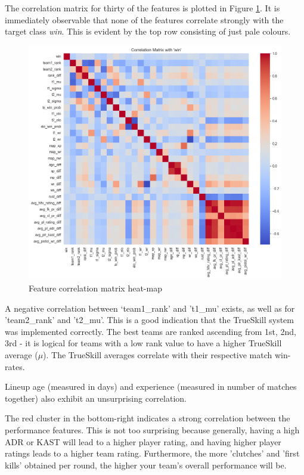 The correlation matrix for thirty of the features is plotted in Figure \ref{fig:corr}. It is immediately observable that none of the features correlate strongly with the target class \textit{win}. This is evident by the top row consisting of just pale colours. 

\begin{figure}[h]
	\centering
	\begin{adjustbox}{center} %
		\includegraphics[width=1.3\textwidth]{Figures/corr-plot.png}
	\end{adjustbox}
	\caption{Feature correlation matrix heat-map}
	\label{fig:corr}
\end{figure}

\clearpage

A negative correlation between `team1\_rank' and 't1\_mu' exists, as well as for 'team2\_rank' and 't2\_mu'. This is a good indication that the TrueSkill system was implemented correctly. The best teams are ranked ascending from 1st, 2nd, 3rd - it is logical for teams with a low rank value to have a higher TrueSkill average ($\mu$). The TrueSkill averages correlate with their respective match win-rates.

Lineup age (measured in days) and experience (measured in number of matches together) also exhibit an unsurprising correlation. 

The red cluster in the bottom-right indicates a strong correlation between the  performance features. This is not too surprising because generally, having a high ADR or KAST will lead to a higher player rating, and having higher player ratings leads to a higher team rating. Furthermore, the more 'clutches' and 'first kills' obtained per round, the higher your team's overall performance will be.

